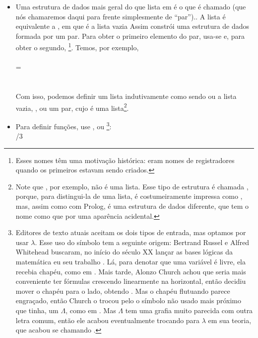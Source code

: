 \documentclass{article}
\begin{document}
\begin{itemize}
\item Uma estrutura de dados mais geral do que lista em
   é o que é chamado  (que nós
  chamaremos daqui para frente simplesmente de ``par'').. A lista
   é equivalente a , em que  é a lista
  vazia
    Assim  constrói uma estrutura de
    dados formada por um par. Para obter o primeiro elemento do par,
    usa-se  e, para obter o segundo,
    \footnote{Esses nomes têm uma motivação histórica:
      eram nomes de registradores quando os primeiros
       estavam sendo criados.}. Temos, por exemplo,\\
     \\
     \seta {} =
    \\
     \\
     \seta {}\\
    Com isso, podemos definir um lista indutivamente como sendo ou a
    lista vazia, , ou um par, cujo
     é uma lista\footnote{Note que ,
      por exemplo, não é uma lista. Esse tipo de estrutura é chamada
      , porque, para distingui-la de uma lista, é
      costumeiramente impressa como , mas, assim como
      com Prolog, é uma estrutura de dados diferente, que tem o nome
       como que por uma aparência acidental.}.
\item Para definir funções, use , ou
  \enphasisb{$\lambda$}\footnote{Editores de texto atuais aceitam os dois tipos de
    entrada, mas optamos por usar $\lambda$. Esse uso do símbolo tem a
    seguinte origem: Bertrand Russel e Alfred Whitehead buscaram, no
    início do século XX lançar as bases lógicas da matemática eu seu
    trabalho . Lá, para denotar que uma
    variável é livre, ela recebia chapéu, como em . Mais tarde, Alonzo Church achou que seria mais conveniente
    ter fórmulas crescendo linearmente na horizontal, então decidiu
    mover o chapéu para o lado, obtendo .
    Mas o chapéu flutuando parece engraçado, então Church o trocou
    pelo  o símbolo não usado mais próximo que tinha, um $\Lambda$, como em
    . Mas
    $\Lambda$ tem uma grafia muito parecida com outra letra comum, então
    ele acabou eventualmente trocando para $\lambda$ em sua teoria, que
    acabou se chamando  \cite{norvig}.}:\\
   /3


\end{itemize}
\end{document}
